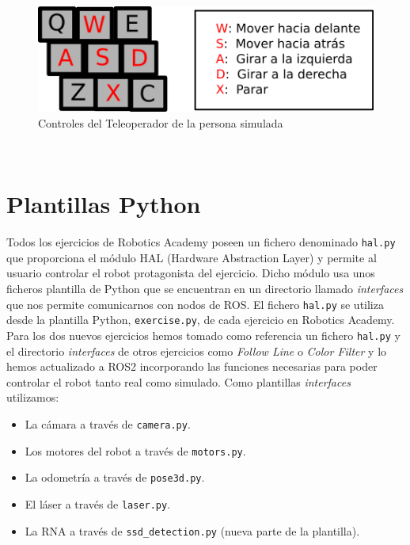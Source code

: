 \begin{figure} [H]
  \begin{center}
    \includegraphics{imagenes/cap5/controles-teleoperador.png}
  \end{center}
  \caption[Controles del teleoperador de la persona simulada]{Controles del Teleoperador de la persona simulada}
  \label{fig:controles_teleoperador}
\end{figure}\



\section{Plantillas Python}
\label{sec:plantilla_python}

Todos los ejercicios de Robotics Academy poseen un fichero denominado \texttt{hal.py} que proporciona el módulo HAL (Hardware Abstraction Layer) y permite al usuario controlar el robot protagonista del ejercicio. Dicho módulo usa unos ficheros plantilla de Python que se encuentran en un directorio llamado \textit{interfaces} que nos permite comunicarnos con nodos de ROS. El fichero \texttt{hal.py} se utiliza desde la plantilla Python, \texttt{exercise.py}, de cada ejercicio en Robotics Academy.\\

Para los dos nuevos ejercicios hemos tomado como referencia un fichero \texttt{hal.py} y el directorio \textit{interfaces} de otros ejercicios como \textit{Follow Line} o \textit{Color Filter} y lo hemos actualizado a ROS2 incorporando las funciones necesarias para poder controlar el robot tanto real como simulado. Como plantillas \textit{interfaces} utilizamos:

\begin{itemize}
	\item La cámara a través de \texttt{camera.py}.
	\item Los motores del robot a través de \texttt{motors.py}.
	\item La odometría a través de \texttt{pose3d.py}.
	\item El láser a través de \texttt{laser.py}.
	\item La RNA a través de \texttt{ssd\_detection.py} (nueva parte de la plantilla).
\end{itemize}\

